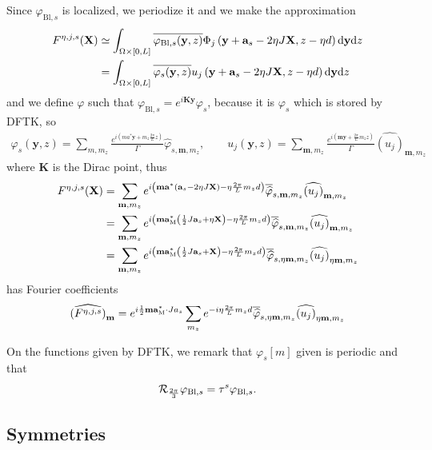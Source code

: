 \documentclass[11pt,a4paper,reqno,french,tikz]{amsart}
\def\d{{\rm d}}
\newcommand{\pa}[1]{\left( #1 \right)} %
\newcommand\vp{\varphi} %
\newcommand{\f}[2]{\frac{#1}{#2}} %
\newcommand{\ind}[1]{_{\textup{#1}}} %
\def\bX{{\mathbf X}}
\def\ba{{\mathbf a}}
\def\bmm{{\mathbf m}}
\def\by{{\mathbf y}}
\def\bK{{\mathbf K}}
\begin{document}
Since $\vp_{\text{Bl},s}$ is localized, we periodize it and we make the approximation
\begin{align*}
	F^{\eta,j,s}(\bX) &\simeq \int_{\Omega \times [0,L]} \overline{\vp_{\text{Bl},s}(\by,z)} \Phi_j\pa{\by +\ba_s -2\eta J \bX,z-\eta d} \d \by \d z \\
&=\int_{\Omega \times [0,L]} \overline{\vp_{s}(\by,z)} u_j\pa{\by +\ba_s -2\eta J \bX,z-\eta d} \d \by \d z
\end{align*}
and we define $\vp$ such that $\vp_{\text{Bl},s} = e^{i \bK \by} \vp_s$, because it is $\widehat{\vp_s}$ which is stored by DFTK, so
\begin{align*}
\vp_{s}(\by,z) = \sum_{m, m_z} \f{e^{i\pa{m a^* \by + m_z \f{2\pi}{L}  z}}}{\Gamma} \widehat{\vp}_{s,\bmm,m_z}, \qquad u_j(\by,z) = \sum_{\bmm, m_z} \f{e^{i\pa{\bmm \by + \f{2\pi}{L} m_z z}}}{\Gamma} \widehat{\pa{u_j}}_{\bmm,m_z}
\end{align*}
where $\bK$ is the Dirac point, thus
\begin{align*}
F^{\eta,j,s}(\bX) &=  \sum_{\bmm, m_z} e^{i\pa{\bmm \ba^* \pa{\ba_s - 2\eta J \bX} - \eta \f{2\pi}{L} m_z d}} \overline{\widehat{\vp}}_{s,\bmm,m_z} \widehat{\pa{u_j}}_{\bmm,m_z} \\
		  &=  \sum_{\bmm, m_z} e^{i\pa{\bmm \ba\ind{M}^* \pa{\f{1}{2} J \ba_s + \eta \bX} - \eta \f{2\pi}{L} m_z d}} \overline{\widehat{\vp}}_{s,\bmm,m_z} \widehat{\pa{u_j}}_{\bmm,m_z} \\
		  &=  \sum_{\bmm, m_z} e^{i\pa{\bmm \ba\ind{M}^* \pa{\f{1}{2} J \ba_s + \bX} - \eta \f{2\pi}{L} m_z d}} \overline{\widehat{\vp}}_{s,\eta \bmm,m_z} \widehat{\pa{u_j}}_{\eta \bmm,m_z}
\end{align*}
has Fourier coefficients
\begin{align*}
\widehat{\pa{F^{\eta,j,s}}}_{\bmm} = e^{i \f{1}{2} \bmm \ba\ind{M}^* \cdot J a_s} \sum_{m_z} e^{-i \eta \f{2\pi}{L} m_z d} \overline{\widehat{\vp}}_{s,\eta \bmm,m_z} \widehat{\pa{u_j}}_{\eta \bmm,m_z}
\end{align*}

On the functions given by DFTK, we remark that $\vp_s[m]$ given is periodic and that 
\begin{align*}
\cR_{\f{2\pi}{3}} \vp_{\text{Bl},s} = \tau^s \vp_{\text{Bl},s}.
\end{align*}




\subsection{Symmetries}%
\label{sub:symmetries}
\end{document}
